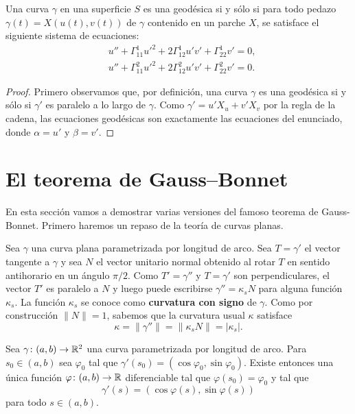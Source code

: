 \begin{corollary}
	Una curva $\gamma$ en una superficie $S$ es una geodésica si y sólo si para
	todo pedazo $\gamma(t)=X(u(t),v(t))$ de $\gamma$ contenido en un parche $X$, se satisface 
	el siguiente sistema de ecuaciones:
	\begin{align*}
		&u''+\Gamma_{11}^1u'^2+2\Gamma_{12}^1u'v'+\Gamma_{22}^1v'=0,\\
		&u''+\Gamma_{11}^2u'^2+2\Gamma_{12}^2u'v'+\Gamma_{22}^2v'=0.
	\end{align*}
\end{corollary}

\begin{proof}
	Primero observamos que, por definición, una curva $\gamma$ es una geodésica si y sólo si $\gamma'$ es paralelo
	a lo largo de $\gamma$. Como $\gamma'=u'X_u+v'X_v$ por la regla de la
	cadena, las ecuaciones geodésicas son exactamente las ecuaciones del
	enunciado, donde $\alpha=u'$ y $\beta=v'$.
\end{proof}


\chapter{El teorema de Gauss--Bonnet}

En esta sección vamos a demostrar varias versiones del famoso teorema de
Gauss-Bonnet. Primero haremos un repaso de la teoría de curvas planas.

Sea $\gamma$ una curva plana parametrizada por longitud de arco. Sea
$T=\gamma'$ el vector tangente a $\gamma$ y sea $N$ el vector unitario normal
obtenido al rotar $T$ en sentido antihorario en un ángulo $\pi/2$. Como
$T'=\gamma''$ y $T=\gamma'$ son perpendiculares, el vector $T'$ es paralelo a
$N$ y luego puede escribirse $\gamma''=\kappa_s N$ para alguna función
$\kappa_s$. La función $\kappa_s$ se conoce como \textbf{curvatura con signo}
de $\gamma$. Como por construcción $\|N\|=1$, sabemos que la curvatura usual $\kappa$ 
satisface 
\[
	\kappa=\|\gamma''\|=\|\kappa_s N\|=|\kappa_s|.
\]

\begin{proposition}
	Sea $\gamma\colon (a,b)\to\mathbb{R}^2$ una curva parametrizada por longitud de arco. Para $s_0\in (a,b)$ sea
	$\varphi_0$ tal que $\gamma'(s_0)=(\cos\varphi_0,\sin\varphi_0)$. Existe entonces una única función 
	$\varphi\colon (a,b)\to\mathbb{R}$ diferenciable tal que $\varphi(s_0)=\varphi_0$ y tal que 
	\[
		\gamma'(s)=(\cos\varphi(s),\sin\varphi(s))
	\]
	para todo $s\in (a,b)$. 
\end{proposition}

